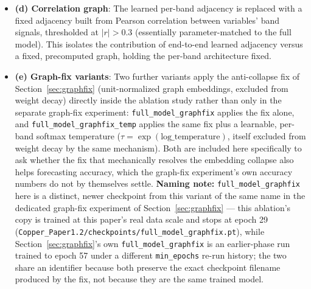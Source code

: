 \documentclass[journal]{IEEEtran}
\begin{document}
\begin{itemize}
    \item \textbf{(d) Correlation graph}: The learned per-band adjacency is replaced with a fixed adjacency built from Pearson correlation between variables' band signals, thresholded at $|r|>0.3$ (essentially parameter-matched to the full model). This isolates the contribution of end-to-end learned adjacency versus a fixed, precomputed graph, holding the per-band architecture fixed.
    \item \textbf{(e) Graph-fix variants}: Two further variants apply the anti-collapse fix of Section~\ref{sec:graphfix} (unit-normalized graph embeddings, excluded from weight decay) directly inside the ablation study rather than only in the separate graph-fix experiment: \texttt{full\_model\_graphfix} applies the fix alone, and \texttt{full\_model\_graphfix\_temp} applies the same fix plus a learnable, per-band softmax temperature ($\tau=\exp(\text{log\_temperature})$, itself excluded from weight decay by the same mechanism). Both are included here specifically to ask whether the fix that mechanically resolves the embedding collapse also helps forecasting accuracy, which the graph-fix experiment's own accuracy numbers do not by themselves settle. \textbf{Naming note:} \texttt{full\_model\_graphfix} here is a distinct, newer checkpoint from this variant of the same name in the dedicated graph-fix experiment of Section~\ref{sec:graphfix} --- this ablation's copy is trained at this paper's real data scale and stops at epoch 29 (\texttt{Copper\_Paper1.2/checkpoints/full\_model\_graphfix.pt}), while Section~\ref{sec:graphfix}'s own \texttt{full\_model\_graphfix} is an earlier-phase run trained to epoch 57 under a different \texttt{min\_epochs} re-run history; the two share an identifier because both preserve the exact checkpoint filename produced by the fix, not because they are the same trained model.
\end{itemize}
\end{document}
